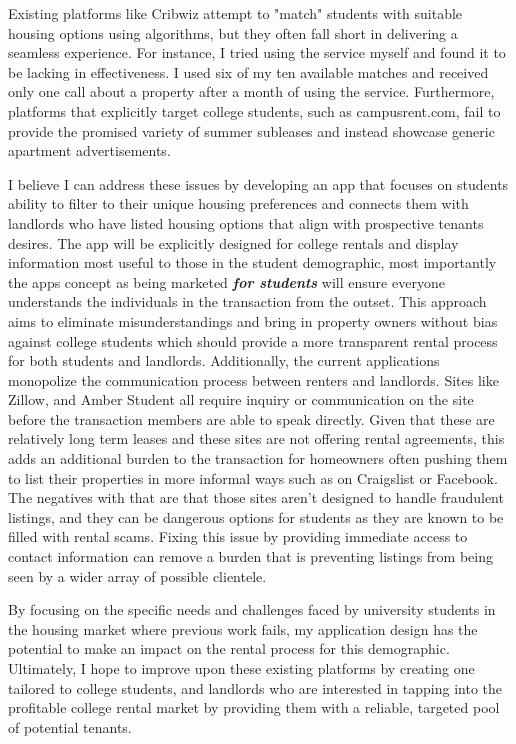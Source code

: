 \documentclass[10pt,twocolumn]{article}
\begin{document}
Existing platforms like Cribwiz attempt to "match" students with suitable housing options using algorithms, but they often fall short in delivering a seamless experience. \cite{cribwiz} For instance, I tried using the service myself and found it to be lacking in effectiveness. I used six of my ten available matches and received only one call about a property after a month of using the service. Furthermore, platforms that explicitly target college students, such as campusrent.com, fail to provide the promised variety of summer subleases and instead showcase generic apartment advertisements.\cite{campusrent}

I believe I can address these issues by developing an app that focuses on students ability to filter to their unique housing preferences and connects them with landlords who have listed housing options that align with prospective tenants desires. The app will be explicitly designed for college rentals and display information most useful to those in the student demographic, most importantly the apps concept as being marketed \textbf{\textit{for students}} will ensure everyone understands the individuals in the transaction from the outset. This approach aims to eliminate misunderstandings and bring in property owners without bias against college students which should provide a more transparent rental process for both students and landlords. Additionally, the current applications monopolize the communication process between renters and landlords. Sites like Zillow, and Amber Student all require inquiry or communication on the site before the transaction members are able to speak directly. \cite{zillow2023} \cite{AmberStudent} Given that these are relatively long term leases and these sites are not offering rental agreements, this adds an additional burden to the transaction for homeowners often pushing them to list their properties in more informal ways such as on Craigslist or Facebook. The negatives with that are that those sites aren't designed to handle fraudulent listings, and they can be dangerous options for students as they are known to be filled with rental scams. \cite{PlaceMeLiving2021} Fixing this issue by providing immediate access to contact information can remove a burden that is preventing listings from being seen by a wider array of possible clientele. 

By focusing on the specific needs and challenges faced by university students in the housing market where previous work fails, my application design has the potential to make an impact on the rental process for this demographic. Ultimately, I hope to improve upon these existing platforms by creating one tailored to college students, and landlords who are interested in tapping into the profitable college rental market by providing them with a reliable, targeted pool of potential tenants.
\end{document}

